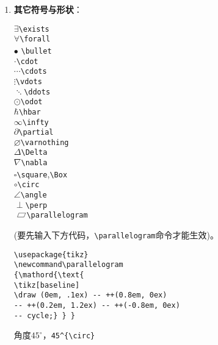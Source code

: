 \documentclass{article}
\newcommand{\q}{\quad}
\newcommand\parallelogram
{\mathord{\text{
\tikz[baseline] 
\draw (0em, .1ex)   -- ++(0.8em, 0ex) 
-- ++(0.2em, 1.2ex) -- ++(-0.8em, 0ex)
-- cycle;} } }
\begin{document}
\begin{multicols}{2}
\begin{enumerate}
        \item \textbf{其它符号与形状}：
              \vspace{-5mm}
              \begin{multicols}{2}
                  $ \exists $\q \verb|\exists| \\
                  $ \forall $\q \verb|\forall| \\
                  $ \bullet $ \q \verb|\bullet| \\
                  $ \cdot $\q \verb|\cdot| \\
                  $ \cdots $\q \verb|\cdots| \\
                  $ \vdots $\q \verb|\vdots| \\
                  $ \ddots $\q \verb|\ddots| \\
                  $ \odot $\q \verb|\odot| \\
                  $ \hbar $\q \verb|\hbar| \\
                  $ \infty $\q \verb|\infty| \\
                  $ \partial $\q \verb|\partial| \\
                  $ \varnothing $\q \verb|\varnothing| \\
                  $ \Delta $\q \verb|\Delta| \\
                  $ \nabla $\q \verb|\nabla| \\
                  $ \square $\q \verb|\square|,\verb|\Box|  \\
                  $ \circ $\q \verb|\circ| \\
                  $ \angle $\q \verb|\angle| \\
                  $ \perp $\q \verb|\perp| \\
                  $ \parallelogram $\q \verb|\parallelogram|
              \end{multicols}
              \vspace{-5mm}
              (要先输入下方代码，\verb|\parallelogram|命令才能生效)。
              \begin{lstlisting}
\usepackage{tikz}
\newcommand\parallelogram
{\mathord{\text{
\tikz[baseline] 
\draw (0em, .1ex) -- ++(0.8em, 0ex) 
-- ++(0.2em, 1.2ex) -- ++(-0.8em, 0ex)
-- cycle;} } }
\end{lstlisting}
              角度$ 45^{\circ} $，\verb|45^{\circ}|


\end{enumerate}
\end{multicols}
\end{document}
